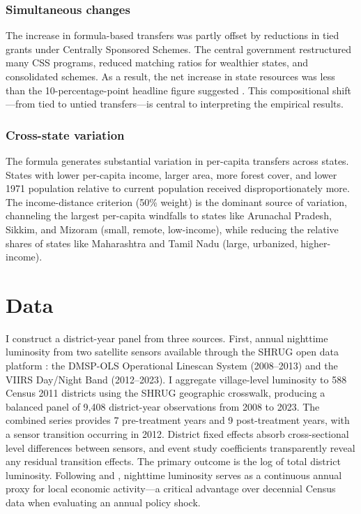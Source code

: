 \documentclass[12pt]{article}
\begin{document}
\subsubsection*{Simultaneous changes} The increase in formula-based transfers was partly offset by reductions in tied grants under Centrally Sponsored Schemes. The central government restructured many CSS programs, reduced matching ratios for wealthier states, and consolidated schemes. As a result, the net increase in state resources was less than the 10-percentage-point headline figure suggested \citep{chakraborty2016fiscal, singh2016fourteenth}. This compositional shift---from tied to untied transfers---is central to interpreting the empirical results.

\subsubsection*{Cross-state variation} The formula generates substantial variation in per-capita transfers across states. States with lower per-capita income, larger area, more forest cover, and lower 1971 population relative to current population received disproportionately more. The income-distance criterion (50\% weight) is the dominant source of variation, channeling the largest per-capita windfalls to states like Arunachal Pradesh, Sikkim, and Mizoram (small, remote, low-income), while reducing the relative shares of states like Maharashtra and Tamil Nadu (large, urbanized, higher-income).


\section{Data}

I construct a district-year panel from three sources. First, annual nighttime luminosity from two satellite sensors available through the SHRUG open data platform \citep{asher2021development}: the DMSP-OLS Operational Linescan System (2008--2013) and the VIIRS Day/Night Band (2012--2023). I aggregate village-level luminosity to 588 Census 2011 districts using the SHRUG geographic crosswalk, producing a balanced panel of 9,408 district-year observations from 2008 to 2023. The combined series provides 7 pre-treatment years and 9 post-treatment years, with a sensor transition occurring in 2012. District fixed effects absorb cross-sectional level differences between sensors, and event study coefficients transparently reveal any residual transition effects. The primary outcome is the log of total district luminosity. Following \citet{henderson2012measuring} and \citet{chen2011using}, nighttime luminosity serves as a continuous annual proxy for local economic activity---a critical advantage over decennial Census data when evaluating an annual policy shock.
\end{document}
